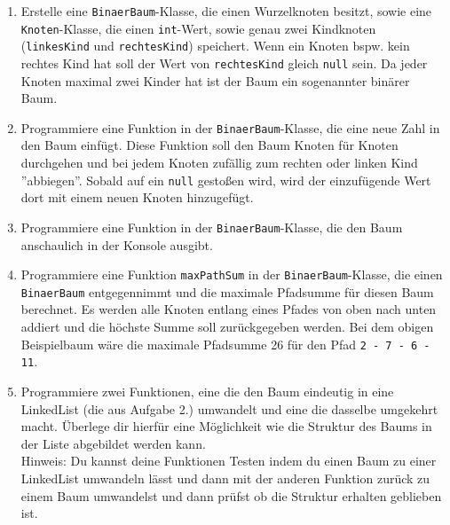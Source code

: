 \documentclass{../../sheet}
\begin{document}
\begin{enumerate}
    \item Erstelle eine \texttt{BinaerBaum}-Klasse, die einen Wurzelknoten besitzt, sowie eine \texttt{Knoten}-Klasse, die einen \texttt{int}-Wert, sowie genau zwei Kindknoten (\texttt{linkesKind} und \texttt{rechtesKind}) speichert. Wenn ein Knoten bspw. kein rechtes Kind hat soll der Wert von \texttt{rechtesKind} gleich \texttt{null} sein. Da jeder Knoten maximal zwei Kinder hat ist der Baum ein sogenannter binärer Baum.
    \item Programmiere eine Funktion in der \texttt{BinaerBaum}-Klasse, die eine neue Zahl in den Baum einfügt. Diese Funktion soll den Baum Knoten für Knoten durchgehen und bei jedem Knoten zufällig zum rechten oder linken Kind ''abbiegen''. Sobald auf ein \texttt{null} gestoßen wird, wird der einzufügende Wert dort mit einem neuen Knoten hinzugefügt.
    \item Programmiere eine Funktion in der \texttt{BinaerBaum}-Klasse, die den Baum anschaulich in der Konsole ausgibt.
    \item Programmiere eine Funktion \texttt{maxPathSum} in der \texttt{BinaerBaum}-Klasse, die einen \texttt{BinaerBaum} entgegennimmt und die maximale Pfadsumme für diesen Baum berechnet. Es werden alle Knoten entlang eines Pfades von oben nach unten addiert und die höchste Summe soll zurückgegeben werden. Bei dem obigen Beispielbaum wäre die maximale Pfadsumme 26 für den Pfad \texttt{2 - 7 - 6 - 11}. 
    \item Programmiere zwei Funktionen, eine die den Baum eindeutig in eine LinkedList (die aus Aufgabe 2.) umwandelt und eine die dasselbe umgekehrt macht. Überlege dir hierfür eine Möglichkeit wie die Struktur des Baums in der Liste abgebildet werden kann.\\
    Hinweis: Du kannst deine Funktionen Testen indem du einen Baum zu einer LinkedList umwandeln lässt und dann mit der anderen Funktion zurück zu einem Baum umwandelst und dann prüfst ob die Struktur erhalten geblieben ist.
\end{enumerate}
\newpage
\end{document}
